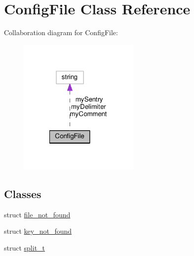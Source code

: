 \hypertarget{classConfigFile}{\section{Config\+File Class Reference}
\label{classConfigFile}
}


Collaboration diagram for Config\+File\+:\nopagebreak
\begin{figure}[H]
\begin{center}
\leavevmode
\includegraphics[width=167pt]{classConfigFile__coll__graph}
\end{center}
\end{figure}
\subsection*{Classes}
\begin{DoxyCompactItemize}
\item 
struct \hyperlink{structConfigFile_1_1file__not__found}{file\+\_\+not\+\_\+found}
\item 
struct \hyperlink{structConfigFile_1_1key__not__found}{key\+\_\+not\+\_\+found}
\item 
struct \hyperlink{structConfigFile_1_1split__t}{split\+\_\+t}
\end{DoxyCompactItemize}
